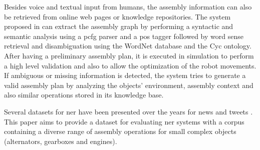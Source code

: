 Besides voice and textual input from humans, the assembly information can also be retrieved from online web pages or knowledge repositories. The system proposed in \cite{Tenorth2010} can extract the assembly graph by performing a syntactic and semantic analysis using a \gls{pcfg} parser and a \gls{pos} tagger followed by word sense retrieval and disambiguation using the WordNet database and the Cyc ontology. After having a preliminary assembly plan, it is executed in simulation to perform a high level validation and also to allow the optimization of the robot movements. If ambiguous or missing information is detected, the system tries to generate a valid assembly plan by analyzing the objects' environment, assembly context and also similar operations stored in its knowledge base.

Several datasets for \gls{ner} have been presented over the years for news and tweets \cite{Dojchinovski2013,Roder2014}. This paper aims to provide a dataset for evaluating \gls{ner} systems with a corpus containing a diverse range of assembly operations for small complex objects (alternators, gearboxes and engines).
